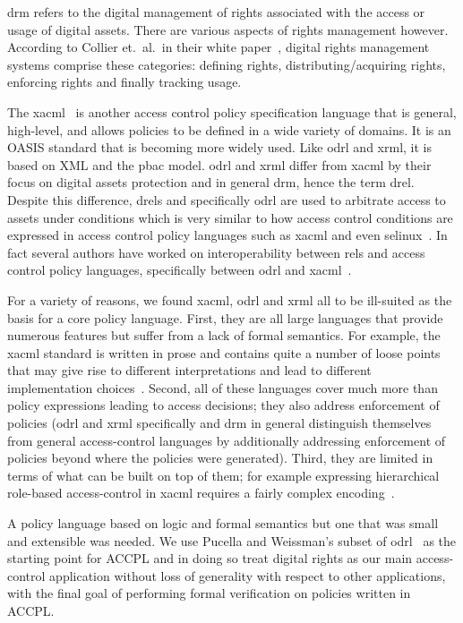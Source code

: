 \documentclass[conference]{IEEEtran}
\begin{document}
\ac{drm} refers to the digital management of rights associated with
the access or usage of digital assets. There are various aspects of
rights management however.
According to Collier et.\ al.\ in their white paper~\cite{collier},
%
digital rights management systems comprise these categories: defining
rights, distributing/acquiring rights, enforcing rights and finally
tracking usage.


The \ac{xacml}~\cite{xacml3} is another access control policy
specification language that is general, high-level, and allows
policies to be defined in a wide variety of domains.  It is an OASIS
standard that is becoming more widely used.  Like \ac{odrl} and
\ac{xrml}, it is based on XML and the \ac{pbac} model.  \ac{odrl} and
\ac{xrml} differ from \ac{xacml} by their focus on digital assets
protection and in general \ac{drm}, hence the term \ac{drel}.  Despite
this difference, \ac{drel}s and specifically \ac{odrl} are used to
arbitrate access to assets under conditions which is very similar to
how access control conditions are expressed in access control policy
languages such as \ac{xacml} and even \ac{selinux}~\cite{selinux}. In
fact several authors have worked on interoperability between \ac{rel}s
and access control policy languages, specifically between \ac{odrl}
and
\ac{xacml}~\cite{prados2005interoperability,maronas2009architecture}.


For a variety of reasons, we found \ac{xacml}, \ac{odrl} and \ac{xrml}
all to be ill-suited as the basis for a core policy language.  First,
they are all large languages that provide numerous features but suffer
from a lack of formal semantics. For example, the \ac{xacml} standard
is written in prose and contains quite a number of loose points that
may give rise to different interpretations and lead to different
implementation choices~\cite{DBLP:conf/essos/MasiPT12}.  Second, all
of these languages cover much more than policy expressions leading to
access decisions; they also address enforcement of policies (\ac{odrl}
and \ac{xrml} specifically and \ac{drm} in general distinguish
themselves from general access-control languages by additionally
addressing enforcement of policies beyond where the policies were
generated). Third, they are limited in terms of what can be built on
top of them; for example expressing hierarchical role-based
access-control in \ac{xacml} requires a fairly complex
encoding~\cite{Tschantz}.


A policy language based on logic and formal semantics but one that was small and extensible was needed. We use Pucella and Weissman's subset of \ac{odrl}~\cite{pucella2006} as the starting point for \ac{ACCPL} and in doing so treat digital rights as our main access-control application without loss of generality with respect to other applications, with the final goal of performing formal verification on policies written in \ac{ACCPL}.
\end{document}
